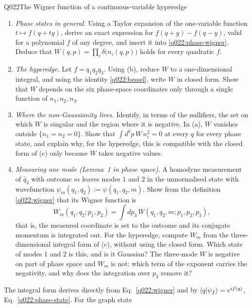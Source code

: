 \begin{entry}{Q022}{The Wigner function of a continuous-variable hyperedge}
\begin{problem}
\begin{enumerate}[label=\textbf{(\alph*)},leftmargin=*]
  \item \emph{Phase states in general.} Using a Taylor expansion of the one-variable
        function $t\mapsto f(q+ty)$, derive an exact expression for $f(q+y)-f(q-y)$,
        valid for a polynomial $f$ of any degree, and insert it into
        \eqref{q022:phase-wigner}. Deduce that
        $W(q,p)=\prod_i\delta\bigl(n_i(q,p)\bigr)$ holds for every quadratic $f$.

  \item \emph{The hyperedge.} Let $f=q_1q_2q_3$. Using (b), reduce $W$ to a
        one-dimensional integral, and using the identity \eqref{q022:bessel}, write
        $W$ in closed form. Show that $W$ depends on the six phase-space
        coordinates only through a single function of $n_1,n_2,n_3$.

  \item \emph{Where the non-Gaussianity lives.} Identify, in terms of the nullifiers,
        the set on which $W$ is singular and the region where it is negative. In (a),
        $W$ vanishes outside $\{n_1=n_2=0\}$. Show that
        $\int d^{k}p\,W\,n_i^{2}=0$ at every $q$ for every phase state, and explain
        why, for the hyperedge, this is compatible with the closed form of (c) only
        because $W$ takes negative values.

  \item \emph{Measuring one mode (Lemma~1 in phase space).} A homodyne measurement of
        $\hat q_3$ with outcome $m$ leaves modes $1$ and $2$ in the unnormalised state
        with wavefunction $\psi_m(q_1,q_2):=\psi(q_1,q_2,m)$. Show from the definition
        \eqref{q022:wigner} that its Wigner function is
        \begin{equation}
          W_m(q_1,q_2;p_1,p_2)=\int dp_3\,W(q_1,q_2,m;p_1,p_2,p_3),
          \label{q022:conditional}
        \end{equation}
        that is, the measured coordinate is set to the outcome and its conjugate
        momentum is integrated out. For the hyperedge, compute $W_m$ from the
        three-dimensional integral form of (c), without using the closed form. Which
        state of modes $1$ and $2$ is this, and is it Gaussian? The three-mode $W$ is
        negative on part of phase space and $W_m$ is not: which term of the exponent
        carries the negativity, and why does the integration over $p_3$ remove it?
\end{enumerate}
\end{problem}

\begin{solution}[Part (a)]
The integral form derives directly from Eq.~\eqref{q022:wigner} and by $\langle q \vert \psi_f \rangle=e^{if(q)}$, Eq.~\eqref{q022:phase-state}. For the graph state


\end{solution}
\end{entry}
